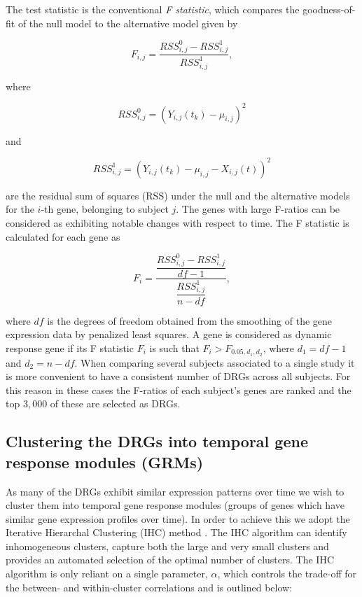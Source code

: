 \par The test statistic is the conventional \emph{F statistic}, which compares the goodness-of-fit of the null model to the alternative model given by

\begin{equation}
\label{eq:altmodel}
F_{i,j}=\frac{RSS_{i,j}^0-RSS_{i,j}^1}{RSS_{i,j}^1},
\end{equation}

where 

\begin{equation} 
RSS_{i,j}^0= (Y_{i,j}(t_{k}) -\mu_{i,j} )^{2}
\end{equation}

and

\begin{equation} RSS_{i,j}^1=(Y_{i,j}(t_{k}) -\mu_{i,j} - X_{i,j}(t))^{2} \end{equation}

are the residual sum of squares (RSS) under the null and the alternative models for the $i$-th gene, belonging to subject $j$. The genes with large F-ratios can be considered as exhibiting notable changes with respect to time. The F statistic is calculated for each gene as

\begin{equation} 
F_i = \dfrac{\dfrac{RSS_{i,j}^0 - RSS_{i,j}^1}{df-1}}{\dfrac{RSS_{i,j}^1}{n-df}},
\end{equation}


where $df$ is the degrees of freedom obtained from the smoothing of the gene expression data by penalized least squares. A gene is considered as dynamic response gene if its F statistic $F_i$ is such that $F_i > F_{0.05, d_1, d_2}$, where $d_1 = df - 1$ and $d_2 = n - df$. When comparing several subjects associated to a single study it is more convenient to have a consistent number of DRGs across all subjects. For this reason in these cases the F-ratios of each subject's genes are ranked and the top $3,000$ of these are selected as DRGs.




\subsection{Clustering the DRGs into temporal gene response modules (GRMs)}
\label{section:identification_of_grms}

As many of the DRGs exhibit similar expression patterns over time we wish to cluster them into temporal gene response modules (groups of genes which have similar gene expression profiles over time). In order to achieve this we adopt the Iterative Hierarchal Clustering (IHC) method \citep{careycluster}. The IHC algorithm can identify inhomogeneous clusters, capture both the large and very small clusters and provides an automated selection of the optimal number of clusters. The IHC algorithm is only reliant on a single parameter, $\alpha$, which controls the trade-off for the between- and within-cluster correlations and is outlined below:

